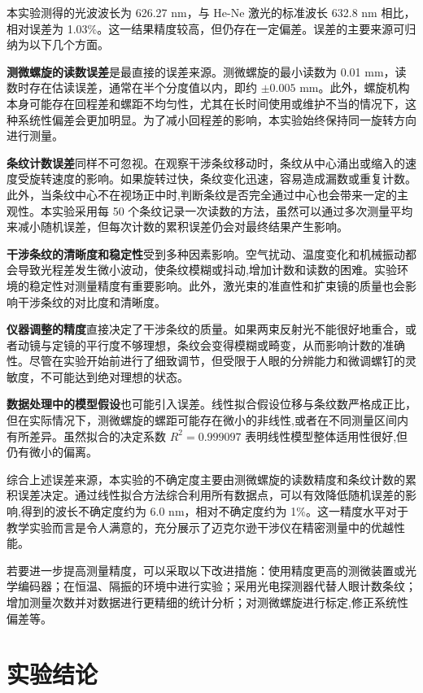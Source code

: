 ﻿\documentclass[12pt,a4paper]{article}
\begin{document}
本实验测得的光波波长为 626.27 nm，与 He-Ne 激光的标准波长 632.8 nm 相比，相对误差为 1.03\%。这一结果精度较高，但仍存在一定偏差。误差的主要来源可归纳为以下几个方面。

\textbf{测微螺旋的读数误差}是最直接的误差来源。测微螺旋的最小读数为 0.01 mm，读数时存在估读误差，通常在半个分度值以内，即约 $\pm 0.005$ mm。此外，螺旋机构本身可能存在回程差和螺距不均匀性，尤其在长时间使用或维护不当的情况下，这种系统性偏差会更加明显。为了减小回程差的影响，本实验始终保持同一旋转方向进行测量。

\textbf{条纹计数误差}同样不可忽视。在观察干涉条纹移动时，条纹从中心涌出或缩入的速度受旋转速度的影响。如果旋转过快，条纹变化迅速，容易造成漏数或重复计数。此外，当条纹中心不在视场正中时,判断条纹是否完全通过中心也会带来一定的主观性。本实验采用每 50 个条纹记录一次读数的方法，虽然可以通过多次测量平均来减小随机误差，但每次计数的累积误差仍会对最终结果产生影响。

\textbf{干涉条纹的清晰度和稳定性}受到多种因素影响。空气扰动、温度变化和机械振动都会导致光程差发生微小波动，使条纹模糊或抖动,增加计数和读数的困难。实验环境的稳定性对测量精度有重要影响。此外，激光束的准直性和扩束镜的质量也会影响干涉条纹的对比度和清晰度。

\textbf{仪器调整的精度}直接决定了干涉条纹的质量。如果两束反射光不能很好地重合，或者动镜与定镜的平行度不够理想，条纹会变得模糊或畸变，从而影响计数的准确性。尽管在实验开始前进行了细致调节，但受限于人眼的分辨能力和微调螺钉的灵敏度，不可能达到绝对理想的状态。

\textbf{数据处理中的模型假设}也可能引入误差。线性拟合假设位移与条纹数严格成正比，但在实际情况下，测微螺旋的螺距可能存在微小的非线性,或者在不同测量区间内有所差异。虽然拟合的决定系数 $R^2 = 0.999097$ 表明线性模型整体适用性很好,但仍有微小的偏离。

综合上述误差来源，本实验的不确定度主要由测微螺旋的读数精度和条纹计数的累积误差决定。通过线性拟合方法综合利用所有数据点，可以有效降低随机误差的影响,得到的波长不确定度约为 6.0 nm，相对不确定度约为 1\%。这一精度水平对于教学实验而言是令人满意的，充分展示了迈克尔逊干涉仪在精密测量中的优越性能。

若要进一步提高测量精度，可以采取以下改进措施：使用精度更高的测微装置或光学编码器；在恒温、隔振的环境中进行实验；采用光电探测器代替人眼计数条纹；增加测量次数并对数据进行更精细的统计分析；对测微螺旋进行标定,修正系统性偏差等。

\section{实验结论}
\end{document}
